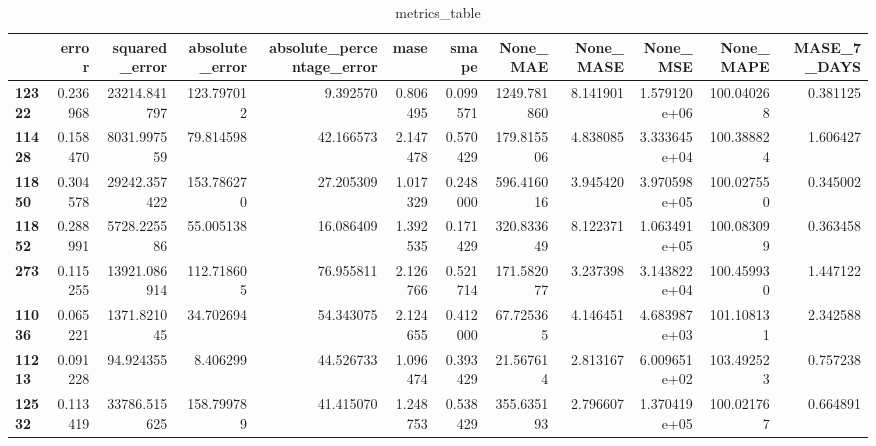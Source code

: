 \begin{table}[h]
\centering
\caption{metrics_table}
\label{table:Test wheather cnnaelstm and lstm used same parametesr for the experiment}
\begin{tabular}{lrrrrrrrrrrr}
\toprule
{} &     error &  squared\_error &  absolute\_error &  absolute\_percentage\_error &      mase &     smape &     None\_MAE &  None\_MASE &      None\_MSE &   None\_MAPE &  MASE\_7\_DAYS \\
\midrule
\textbf{12322} &  0.236968 &   23214.841797 &      123.797012 &                   9.392570 &  0.806495 &  0.099571 &  1249.781860 &   8.141901 &  1.579120e+06 &  100.040268 &     0.381125 \\
\textbf{11428} &  0.158470 &    8031.997559 &       79.814598 &                  42.166573 &  2.147478 &  0.570429 &   179.815506 &   4.838085 &  3.333645e+04 &  100.388824 &     1.606427 \\
\textbf{11850} &  0.304578 &   29242.357422 &      153.786270 &                  27.205309 &  1.017329 &  0.248000 &   596.416016 &   3.945420 &  3.970598e+05 &  100.027550 &     0.345002 \\
\textbf{11852} &  0.288991 &    5728.225586 &       55.005138 &                  16.086409 &  1.392535 &  0.171429 &   320.833649 &   8.122371 &  1.063491e+05 &  100.083099 &     0.363458 \\
\textbf{273  } &  0.115255 &   13921.086914 &      112.718605 &                  76.955811 &  2.126766 &  0.521714 &   171.582077 &   3.237398 &  3.143822e+04 &  100.459930 &     1.447122 \\
\textbf{11036} &  0.065221 &    1371.821045 &       34.702694 &                  54.343075 &  2.124655 &  0.412000 &    67.725365 &   4.146451 &  4.683987e+03 &  101.108131 &     2.342588 \\
\textbf{11213} &  0.091228 &      94.924355 &        8.406299 &                  44.526733 &  1.096474 &  0.393429 &    21.567614 &   2.813167 &  6.009651e+02 &  103.492523 &     0.757238 \\
\textbf{12532} &  0.113419 &   33786.515625 &      158.799789 &                  41.415070 &  1.248753 &  0.538429 &   355.635193 &   2.796607 &  1.370419e+05 &  100.021767 &     0.664891 \\
\bottomrule
\end{tabular}
\end{table}
